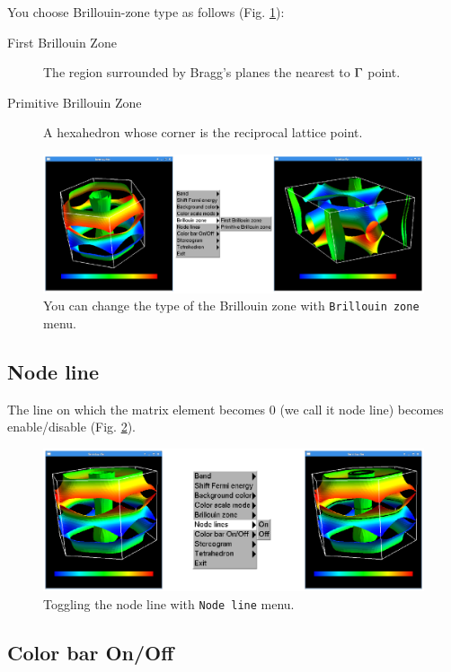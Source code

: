 \documentclass[12pt]{article}
\begin{document}
You choose Brillouin-zone type as follows (Fig. \ref{fig_brillouinzone}): 
\begin{description}
\item[First Brillouin Zone] The region surrounded by Bragg's planes
  the nearest to ${\rm \Gamma}$ point.
\item[Primitive Brillouin Zone] A hexahedron 
  whose corner is the reciprocal lattice point.
\end{description}

\begin{figure}[!ht]
  \includegraphics[width=17cm]{figs/brillouinzone.eps}
  \caption{You can change the type of the Brillouin zone 
    with \texttt{Brillouin zone} menu.}
  \label{fig_brillouinzone}
\end{figure}

\newpage

\subsection{Node line}

The line on which the matrix element becomes 0 (we call it node line)
becomes enable/disable (Fig. \ref{fig_nodeline}).

\begin{figure}[!ht]
  \includegraphics[width=17cm]{figs/nodeline.eps}
  \caption{Toggling the node line with \texttt{Node line} menu.}
  \label{fig_nodeline}
\end{figure}

\subsection{Color bar On/Off}
\end{document}
